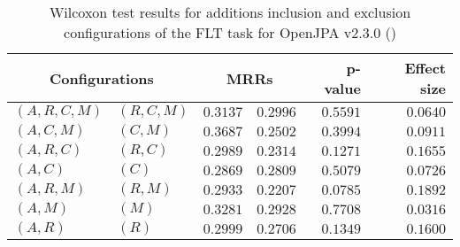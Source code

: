 
\begin{table}
\begin{spacing}{1.2}
\centering
\caption{Wilcoxon test results for additions inclusion and exclusion configurations of the FLT task for OpenJPA v2.3.0 (\ctwo)}
\label{table:versus-wilcox-openjpa-flt-additions}
\begin{tabular}{ll|rr|rr}
\toprule
      \multicolumn{2}{c|}{Configurations} &                \multicolumn{2}{c|}{MRRs} &        p-value & Effect size \\
\midrule
 $(A,R,C,M)$ &  $(R,C,M)$ &  $\bm{0.3137}$ &  $0.2996$ & $0.5591$ &    $0.0640$ \\
   $(A,C,M)$ &    $(C,M)$ &  $\bm{0.3687}$ &  $0.2502$ & $0.3994$ &    $0.0911$ \\
   $(A,R,C)$ &    $(R,C)$ &  $\bm{0.2989}$ &  $0.2314$ & $0.1271$ &    $0.1655$ \\
     $(A,C)$ &      $(C)$ &  $\bm{0.2869}$ &  $0.2809$ & $0.5079$ &    $0.0726$ \\
   $(A,R,M)$ &    $(R,M)$ &  $\bm{0.2933}$ &  $0.2207$ & $0.0785$ &    $0.1892$ \\
     $(A,M)$ &      $(M)$ &  $\bm{0.3281}$ &  $0.2928$ & $0.7708$ &    $0.0316$ \\
     $(A,R)$ &      $(R)$ &  $\bm{0.2999}$ &  $0.2706$ & $0.1349$ &    $0.1600$ \\
\bottomrule
\end{tabular}

\end{spacing}
\end{table}


